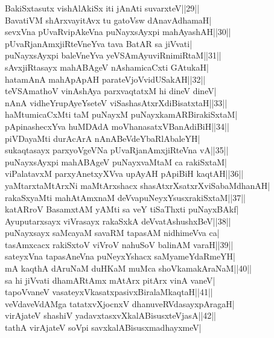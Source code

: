 \documentclass{article}
\begin{document}
BakiSxtasutx vishAlAkiSx iti jAnAti suvarxteV||29||\\
BavatiVM shArxvayitAvx tu gatoVsw dAnavAdhamaH|\\
sevxVna pUvaRvipAkeVna puNayxsAyxpi mahAyashAH||30||\\
pUvaRjanAmxjiRteVneYva tava BatAR sa jiVvati|\\
puNayxsAyxpi baleVneYva yeVSAmAyuviRnimiRtaM||31||\\
sAvxjiRtasayx mahABAgeV nAshamicaCxti GAtukaH|\\
hatamAnA mahApApAH parateVjoVvidUSakAH||32||\\
teVSAmathoV vinAshAya parxvaqtatxM hi dineV dineV|\\
nAnA vidheYrupAyeYseteV viSashasAtxrXdiBisatxtaH||33||\\
haMtumicaCxMti taM puNayxM puNayxkamARBirakiSxtaM|\\
pApinashecxYva huMDAdA moVhanasatxVBanAdiBiH||34||\\
piVDayaMti durAcArA nAnABeVdeYbaRlAbaleYH|\\
sukaqtasayx parxyoVgeVNa pUvaRjanAmxjiRteVna vA||35||\\
puNayxsAyxpi mahABAgeV puNayxvaMtaM ca rakiSxtaM|\\
viPalatavxM parxyAnetxyXVva upAyAH pApiBiH kaqtAH||36||\\
yaMtarxtaMtArxNi maMtArxshacx shasAtxrXsatxrXviSabaMdhanAH|\\
rakaSxyaMti mahAtAmxnaM deVvapuNeyxYsusxrakiSxtaM||37||\\
katARroV BasamxtAM yAMti sa veY tiSaThxti puNayxBAkf|\\
Ayuputarxsayx viVrasayx rakaSxkA deVvatAshushxBeV||38||\\
puNayxsayx saMcayaM savaRM tapasAM nidhimeVva ca|\\
tasAmxcacx rakiSxtoV viVroV nahuSoV balinAM varaH||39||\\
sateyxVna tapasAneVna puNeyxYshacx saMyameYdaRmeYH|\\
mA kaqthA dAruNaM duHKaM muMca shoVkamakAraNaM||40||\\
sa hi jiVvati dhamARtAmx mAtArx pitArx vinA vaneV|\\
tapoVvaneV vasateyxVkasatxpasivxBiralaMkaqtaH||41||\\
veVdaveVdAMga tatatxvXjocnxV dhanuveRVdasayxpAragaH|\\
virAjateV shashiV yadavxtasxvXkalABisusxteVjasA||42||\\
tathA virAjateV soVpi savxkalABisusxmadhayxmeV|\\
\end{document}

